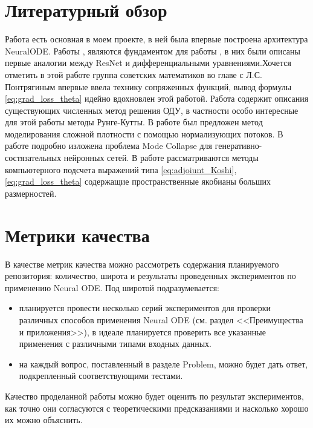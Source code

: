 \documentclass[]{scrartcl}
\begin{document}
\section{Литературный обзор}
Работа \cite{NeuralODE} есть основная в моем проекте, в ней была впервые построена архитектура NeuralODE. Работы \cite{OptNet_diff_opt}, \cite{arbitr_deep_ResNN} являются фундаментом для работы \cite{NeuralODE}, в них были описаны первые аналогии между ResNet и дифференциальными уравнениями.Хочется отметить \cite{PontryaginPrinciples} в этой работе группа советских математиков во главе с Л.С. Понтрягиным впервые ввела технику сопряженных функций, вывод формулы \eqref{eq:grad_loss_theta} идейно вдохновлен этой работой. Работа \cite{RK_method} содержит описания существующих численных метод решения ОДУ, в частности особо интересные для этой работы методы Рунге-Кутты.  В работе \cite{normalizing_flows} был предложен метод моделирования сложной плотности с помощью нормализующих потоков. В работе \cite{modecollapse} подробно изложена проблема Mode Collapse для генеративно-состязательных нейронных сетей. В работе \cite{CasADi} рассматриваются методы компьютерного подсчета выражений типа \eqref{eq:adjoiunt_Koshi},\eqref{eq:grad_loss_theta} содержащие пространственные якобианы больших размерностей.

\section{Метрики качества}
В качестве метрик качества можно рассмотреть содержания планируемого репозитория: количество, широта и результаты проведенных экспериментов по  применению Neural ODE. Под широтой подразумевается:
\begin{itemize}
\item планируется провести несколько серий экспериментов для проверки различных способов применения Neural ODE (см. раздел <<Преимущества и приложения>>), в идеале планируется проверить все указанные применения с различными типами входных данных.
\item на каждый вопрос, поставленный в разделе Problem, можно будет дать ответ, подкрепленный соответствующими тестами.
\end{itemize}  
Качество проделанной работы можно будет оценить по результат экспериментов, как точно они согласуются с теоретическими предсказаниями и насколько хорошо их можно объяснить. 
\end{document}
